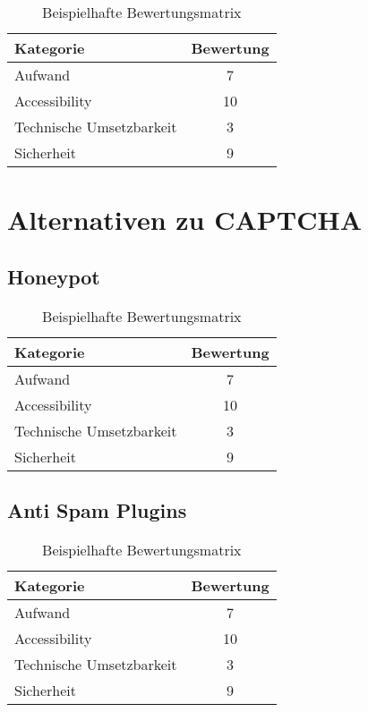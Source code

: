 \begin{table}[h!]
    \caption{Beispielhafte Bewertungsmatrix}
    \begin{center}
        \begin{tabular}{l|c}
            Kategorie                       & Bewertung \\\hline
            Aufwand                         & 7         \\
            Accessibility                   & 10        \\
            Technische Umsetzbarkeit        & 3         \\
            Sicherheit                      & 9         
        \end{tabular}
    \end{center}
\end{table}

\section{Alternativen zu CAPTCHA}

\subsection{Honeypot}

\begin{table}[h!]
    \caption{Beispielhafte Bewertungsmatrix}
    \begin{center}
        \begin{tabular}{l|c}
            Kategorie                       & Bewertung \\\hline
            Aufwand                         & 7         \\
            Accessibility                   & 10        \\
            Technische Umsetzbarkeit        & 3         \\
            Sicherheit                      & 9         
        \end{tabular}
    \end{center}
\end{table}

\subsection{Anti Spam Plugins}

\begin{table}[h!]
    \caption{Beispielhafte Bewertungsmatrix}
    \begin{center}
        \begin{tabular}{l|c}
            Kategorie                       & Bewertung \\\hline
            Aufwand                         & 7         \\
            Accessibility                   & 10        \\
            Technische Umsetzbarkeit        & 3         \\
            Sicherheit                      & 9         
        \end{tabular}
    \end{center}
\end{table}

